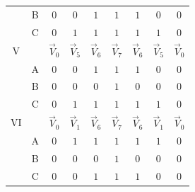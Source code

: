 \documentclass[11pt]{report}
\begin{document}
\begin{table}[htbp]
\begin{tabular}{c c c c c c c c c }
		                  & B & $0$         & $0$         & $1$         & $1$         & $1$         & $0$         & $0$         \\
		                  & C & $0$         & $1$         & $1$         & $1$         & $1$         & $1$         & $0$         \\
		\hline
		V                 &   & $\vec{V}_0$ & $\vec{V}_5$ & $\vec{V}_6$ & $\vec{V}_7$ & $\vec{V}_6$ & $\vec{V}_5$ & $\vec{V}_0$ \\
		                  & A & $0$         & $0$         & $1$         & $1$         & $1$         & $0$         & $0$         \\
		                  & B & $0$         & $0$         & $0$         & $1$         & $0$         & $0$         & $0$         \\
		                  & C & $0$         & $1$         & $1$         & $1$         & $1$         & $1$         & $0$         \\
		\hline
		VI                &   & $\vec{V}_0$ & $\vec{V}_1$ & $\vec{V}_6$ & $\vec{V}_7$ & $\vec{V}_6$ & $\vec{V}_1$ & $\vec{V}_0$ \\
		                  & A & $0$         & $1$         & $1$         & $1$         & $1$         & $1$         & $0$         \\
		                  & B & $0$         & $0$         & $0$         & $1$         & $0$         & $0$         & $0$         \\
		                  & C & $0$         & $0$         & $1$         & $1$         & $1$         & $0$         & $0$         \\
		\hline
	\end{tabular}
\end{table}
\end{document}
